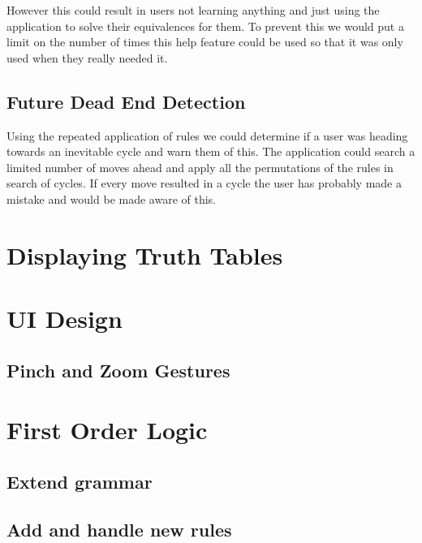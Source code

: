 \documentclass{report}
\begin{document}
However this could result in users not learning anything and just using the application to solve their equivalences for them. To prevent this we would put a limit on the number of times this help feature could be used so that it was only used when they really needed it.

\subsection{Future Dead End Detection}

Using the repeated application of rules we could determine if a user was heading towards an inevitable cycle and warn them of this. The application could search a limited number of moves ahead and apply all the permutations of the rules in search of cycles. If every move resulted in a cycle the user has probably made a mistake and would be made aware of this.

\section{Displaying Truth Tables}

\section{UI Design}
\subsection{Pinch and Zoom Gestures}

\section{First Order Logic}
\subsection{Extend grammar}
\subsection{Add and handle new rules}
\end{document}

